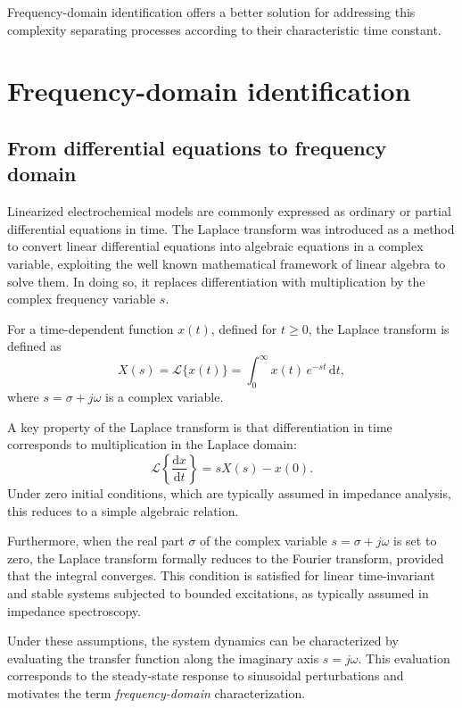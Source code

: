 Frequency-domain identification offers a better solution for addressing this complexity separating processes according to their characteristic time constant.

\section{Frequency-domain identification}

\subsection{From differential equations to frequency domain}
\label{sec:laplace}

Linearized electrochemical models are commonly expressed as ordinary or partial differential equations in time.
The Laplace transform was introduced as a method to convert linear differential equations into algebraic equations in a complex variable, exploiting the well known mathematical framework of linear algebra to solve them.
In doing so, it replaces differentiation with multiplication by the complex frequency variable \( s \).

For a time-dependent function \( x(t) \), defined for \( t \geq 0 \), the Laplace transform is defined as
\begin{equation}
X(s) = \mathcal{L}\{x(t)\} = \int_{0}^{\infty} x(t)\,e^{-s t}\,\mathrm{d}t,
\end{equation}
where \( s = \sigma + j\omega \) is a complex variable.

A key property of the Laplace transform is that differentiation in time corresponds to multiplication in the Laplace domain:
\begin{equation}
\mathcal{L}\left\{\frac{\mathrm{d}x}{\mathrm{d}t}\right\} = s X(s) - x(0).
\end{equation}
Under zero initial conditions, which are typically assumed in impedance analysis, this reduces to a simple algebraic relation.

Furthermore, when the real part \( \sigma \) of the complex variable \( s = \sigma + j\omega \) is set to zero, the Laplace transform formally reduces to the Fourier transform, provided that the integral converges.
This condition is satisfied for linear time-invariant and stable systems subjected to bounded excitations, as typically assumed in impedance spectroscopy.

Under these assumptions, the system dynamics can be characterized by evaluating the transfer function along the imaginary axis \( s = j\omega \).
This evaluation corresponds to the steady-state response to sinusoidal perturbations and motivates the term \emph{frequency-domain} characterization.

